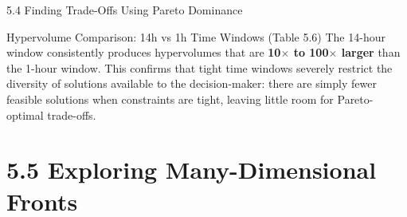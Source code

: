 \documentclass[aspectratio=169,10pt]{beamer}
\begin{document}
\begin{frame}[allowframebreaks]{5.4 Finding Trade-Offs Using Pareto Dominance}
\begin{block}{Hypervolume Comparison: 14h vs 1h Time Windows (Table 5.6)}
    The 14-hour window consistently produces hypervolumes that are
    \textbf{10$\times$ to 100$\times$ larger} than the 1-hour window.
    This confirms that tight time windows severely restrict the diversity
    of solutions available to the decision-maker: there are simply fewer
    feasible solutions when constraints are tight, leaving little room for
    Pareto-optimal trade-offs.
  \end{block}

\end{frame}

\section{5.5 Exploring Many-Dimensional Fronts}
\end{document}
